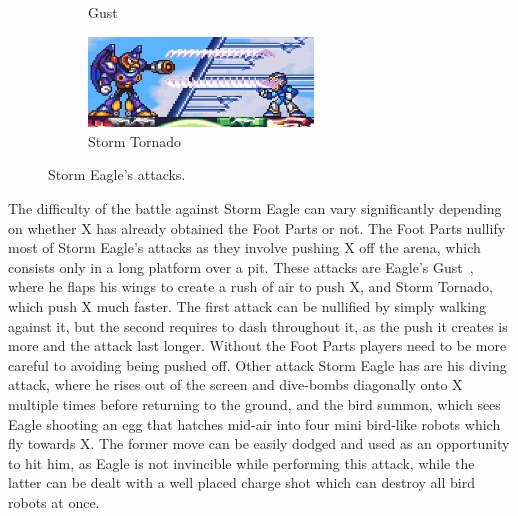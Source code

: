 \begin{figure}[htp]
\begin{subfigure}{.49\linewidth}
		\caption{Gust}
	\end{subfigure}
	\begin{subfigure}{.49\linewidth}
		\centering
		\includegraphics[height=2.4cm]{figures/X1/Storm_eagle/Eagle_tornado.jpg}
		\caption{Storm Tornado}
	\end{subfigure}
	\caption{Storm Eagle's attacks.}
\end{figure}
The difficulty of the battle against Storm Eagle can vary significantly depending on whether X has already obtained the Foot Parts or not. The Foot Parts nullify most of Storm Eagle's attacks as they involve pushing X off the arena, which consists only in a long platform over a pit. These attacks are Eagle's Gust~\cite{wiki:Storm_eagle}, where he flaps his wings to create a rush of air to push X, and Storm Tornado, which push X much faster. The first attack can be nullified by simply walking against it, but the second requires to dash throughout it, as the push it creates is more and the attack last longer. Without the Foot Parts players need to be more careful to avoiding being pushed off. Other attack Storm Eagle has are his diving attack, where he rises out of the screen and dive-bombs diagonally onto X multiple times before returning to the ground, and the bird summon, which sees Eagle shooting an egg that hatches mid-air into four mini bird-like robots which fly towards X. The former move can be easily dodged and used as an opportunity to hit him, as Eagle is not invincible while performing this attack, while the latter can be dealt with a well placed charge shot which can destroy all bird robots at once.
